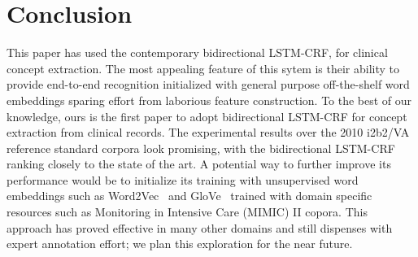 \section{Conclusion
 } \label{Sec:Conclusion}
 This paper has used the contemporary bidirectional LSTM-CRF, for clinical concept extraction. The most appealing feature of this sytem   is their ability to provide end-to-end recognition initialized with general purpose off-the-shelf word embeddings sparing effort from laborious feature construction. To the best of our knowledge, ours is the first paper to adopt bidirectional LSTM-CRF for concept extraction from clinical records. The experimental results over the  2010 i2b2/VA reference standard corpora look promising, with the bidirectional LSTM-CRF ranking closely to the state of the art. A potential way to further improve its performance would be to initialize its training with unsupervised word embeddings such as Word2Vec~\cite{Mikolov:13} and GloVe~\cite{Pennington:14} trained with domain specific resources such as Monitoring in Intensive Care (MIMIC) II copora. This approach has proved effective in many other domains and still dispenses with expert annotation effort; we plan this exploration for the near future.







